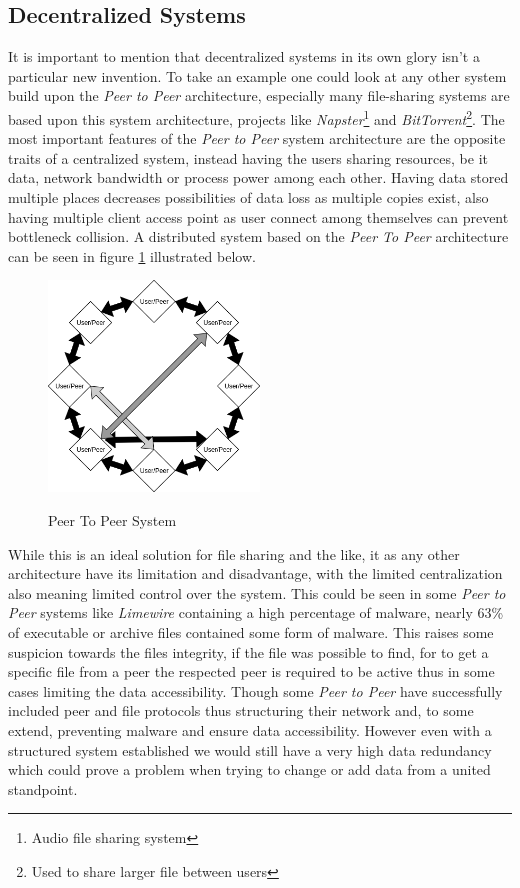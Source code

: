 \documentclass[paper=a4, fontsize=11pt]{scrartcl} %
\numberwithin{equation}{section} %
\numberwithin{figure}{section} %
\numberwithin{table}{section} %
\begin{document}
\subsection{Decentralized Systems}

It is important to mention that decentralized systems in its own glory isn't a particular new invention. To take an example one could look at any other system build upon the \textit{Peer to Peer} architecture, especially many file-sharing systems are based upon this system architecture, projects like \textit{Napster}\footnote{Audio file sharing system\cite{napster}} and \textit{BitTorrent}\footnote{Used to share larger file between users\cite{bittorrent}}. The most important features of the \textit{Peer to Peer} system architecture are the opposite traits of a centralized system, instead having the users sharing resources, be it data, network bandwidth or process power among each other\cite{peer-to-peer}. Having data stored multiple places decreases possibilities of data loss as multiple copies exist, also having multiple client access point as user connect among themselves can prevent bottleneck collision. A distributed system based on the \textit{Peer To Peer} architecture can be seen in figure \ref{fig:peer} illustrated below.

\begin{figure}[H]
  \caption{Peer To Peer System }
  \centering
    \includegraphics[width=0.5\textwidth]{p2p.png}
  \label{fig:peer}
\end{figure}

While this is an ideal solution for file sharing and the like, it as any other architecture have its limitation and disadvantage, with the limited centralization also meaning limited control over the system. This could be seen in some \textit{Peer to Peer} systems like \textit{Limewire} containing a high percentage of malware, nearly 63\% of executable or archive files contained some form of malware\cite{limestat}. This raises some suspicion towards the files integrity, if the file was possible to find, for to get a specific file from a peer the respected peer is required to be active thus in some cases limiting the data accessibility. Though some \textit{Peer to Peer} have successfully included peer and file protocols thus structuring their network and, to some extend, preventing malware and ensure data accessibility\cite{peer-to-peer}. However even with a structured system established we would still have a very high data redundancy which could prove a problem when trying to change or add data from a united standpoint. \\
\end{document}
